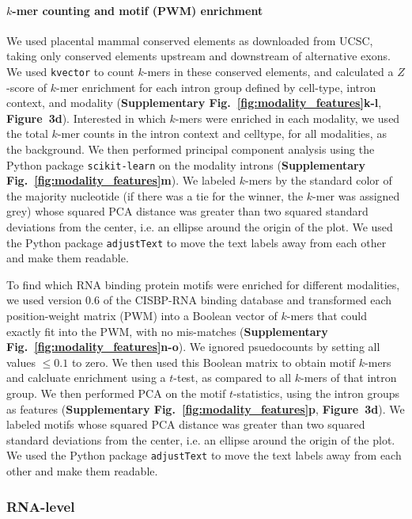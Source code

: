 \paragraph{$k$-mer counting and motif (PWM) enrichment}
We used placental mammal conserved elements as downloaded from UCSC\cite{Rosenbloom:2015bg}, taking only conserved elements upstream and downstream of alternative exons. We used \texttt{kvector}\cite{Anonymous:ug} to count $k$-mers in these conserved elements, and calculated a $Z$-score of $k$-mer enrichment for each intron group defined by cell-type, intron context, and modality (\textbf{Supplementary Fig.~\ref{fig:modality_features}k-l}, \textbf{Figure~3d}). Interested in which $k$-mers were enriched in each modality, we used the total $k$-mer counts in the intron context and celltype, for all modalities, as the background. We then performed principal component analysis using the Python package \texttt{scikit-learn}\cite{Pedregosa:2011tv} on the modality introns (\textbf{Supplementary Fig.~\ref{fig:modality_features}m}). We labeled $k$-mers by the standard color of the majority nucleotide (if there was a tie for the winner, the $k$-mer was assigned grey) whose squared PCA distance was greater than two squared standard deviations from the center, i.e. an ellipse around the origin of the plot. We used the Python package \texttt{adjustText}\cite{Anonymous:tk} to move the text labels away from each other and make them readable.

To find which RNA binding protein motifs were enriched for different modalities, we used version 0.6 of the CISBP-RNA binding database\cite{Ray:2013br} and transformed each position-weight matrix (PWM) into a Boolean vector of $k$-mers that could exactly fit into the PWM, with no mis-matches (\textbf{Supplementary Fig.~\ref{fig:modality_features}n-o}). We ignored psuedocounts by setting all values $\leq 0.1$ to zero. We then used this Boolean matrix to obtain motif $k$-mers and calcluate enrichment using a $t$-test, as compared to all $k$-mers of that intron group. We then performed PCA on the motif $t$-statistics, using the intron groups as features (\textbf{Supplementary Fig.~\ref{fig:modality_features}p}, \textbf{Figure~3d}). We labeled motifs whose squared PCA distance was greater than two squared standard deviations from the center, i.e. an ellipse around the origin of the plot. We used the Python package \texttt{adjustText}\cite{Anonymous:tk} to move the text labels away from each other and make them readable.


\subsubsection{RNA-level}

